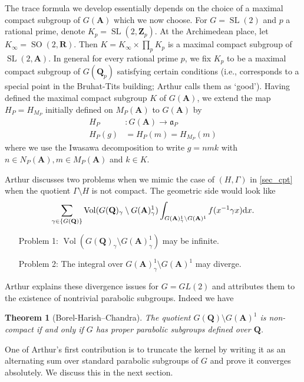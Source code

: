 \documentclass[11pt]{amsart}
\def\A{\mathbf A}
\def\Q{\mathbf Q}
\def\R{\mathbf R}
\def\Z{\mathbf Z}
\def\aaa{\mathfrak a}
\def\cb#1{{\color{black}#1}}
\def\d{\text d}
\def\bs{\setminus} 			%
\def\sl{\operatorname{SL}}
\def\so{\operatorname{SO}}
\def\vol{\operatorname{Vol}}
\newtheorem{theorem}{Theorem}[section]
\theoremstyle{remark}
\begin{document}
The trace formula we develop essentially depends on the choice of a maximal compact subgroup of $G(\A)$ which we now choose. \cb{For $G = \sl(2)$ and $p$ a rational prime, denote $K_p = \sl(2, \Z_p)$. At the Archimedean place, let $K_\infty = \so(2, \R)$. Then $K = K_\infty \times \prod_p K_p$ is a maximal compact subgroup of $\sl(2, \A)$.} In general for every rational prime $p$, we fix $K_p$ to be a maximal compact subgroup of $G(\Q_p)$ satisfying certain conditions (i.e., corresponds to a special point in the Bruhat-Tits building; Arthur calls them as `good'). Having defined the maximal compact subgroup $K$ of $G(\A)$, we extend the map $H_P = H_{M_P}$ initially defined on $M_P(\A)$ to $G(\A)$ by
\begin{align*}
	H_P & : G(\A) \to \aaa_P \\
	H_P(g) & = H_P(m) = H_{M_P}(m)
\end{align*} 
where we use the Iwasawa decomposition to write $g = nmk$ with $n \in N_P(\A), m \in M_P(\A)$ and $k \in K$. 

Arthur discusses two problems when we mimic the case of $(H, \Gamma)$ in \cref{sec_cpt} when the quotient $\Gamma\bs H$ is not compact. The geometric side would look like 
\[ \sum_{\gamma \in \{G(\Q)\}} \vol(G(\Q)_\gamma\bs G(\A)_\gamma^1) \int_{G(\A)^1_\gamma \bs G(\A)^1} f(x^{-1}\gamma x) \d x.\]

\begin{itemize}
\item[Problem 1:] $\vol(G(\Q)_\gamma\bs G(\A)_\gamma^1)$ may be infinite. 
\item[Problem 2:] The integral over $G(\A)^1_\gamma \bs G(\A)^1$ may diverge. 
\end{itemize}

Arthur explains these divergence issues for $G = GL(2)$ and attributes them to the existence of nontrivial parabolic subgroups. Indeed we have

\begin{theorem} [Borel-Harish--Chandra]
The quotient $G(\Q)\bs G(\A)^1$ is non-compact if and only if $G$ has proper parabolic subgroups defined over $\Q$. 
\end{theorem}

One of Arthur's first contribution is to truncate the kernel by writing it as an alternating sum over standard parabolic subgroups of $G$ and prove it converges absolutely. We discuss this in the next section. 

\end{document}
